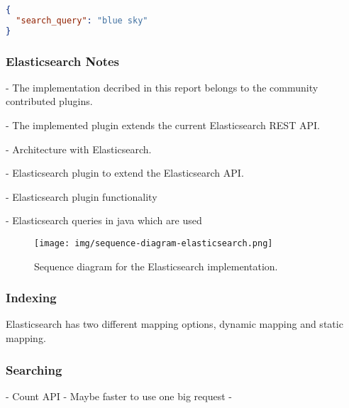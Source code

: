 \begin{lstlisting}[language=json, caption={The POST request body for the implemented query expansion.}, label={lst:rest-api-extension}]
{
  "search_query": "blue sky"
}
\end{lstlisting}

\subsubsection{Elasticsearch Notes}
- The implementation decribed in this report belongs to the community contributed plugins.

- The implemented plugin extends the current Elasticsearch REST API.

- Architecture with Elasticsearch.

- Elasticsearch plugin to extend the Elasticsearch API.

- Elasticsearch plugin functionality

- Elasticsearch queries in java which are used

\begin{figure}[h!]
\centering \texttt{[image: img/sequence-diagram-elasticsearch.png]}
\caption{Sequence diagram for the Elasticsearch implementation.}
\label{fig:sequence-diagram-lucene}
\end{figure}

\subsubsection{Indexing}
Elasticsearch has two different mapping options, dynamic mapping and static mapping.

\subsubsection{Searching}
- Count API
- Maybe faster to use one big request
-
